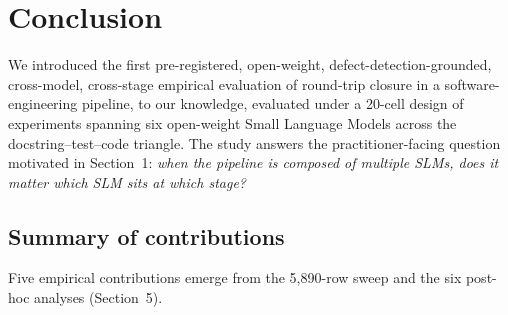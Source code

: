 \section{Conclusion}
\label{sec:conclusion}

We introduced the first pre-registered, open-weight, defect-detection-grounded, cross-model, cross-stage empirical evaluation of round-trip closure in a software-engineering pipeline, to our knowledge, evaluated under a 20-cell design of experiments spanning six open-weight Small Language Models across the docstring--test--code triangle. The study answers the practitioner-facing question motivated in Section~1: \emph{when the pipeline is composed of multiple SLMs, does it matter which SLM sits at which stage?}

\subsection{Summary of contributions}

Five empirical contributions emerge from the 5{,}890-row sweep and the six post-hoc analyses (Section~5).

